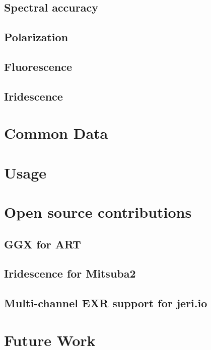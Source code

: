 \subsection{Spectral accuracy}

\subsection{Polarization}

\subsection{Fluorescence}

\subsection{Iridescence}

\section{Common Data}

\section{Usage}

\section{Open source contributions}

\subsection{GGX for ART}

\subsection{Iridescence for Mitsuba2}

\subsection{Multi-channel EXR support for jeri.io}

\section{Future Work}